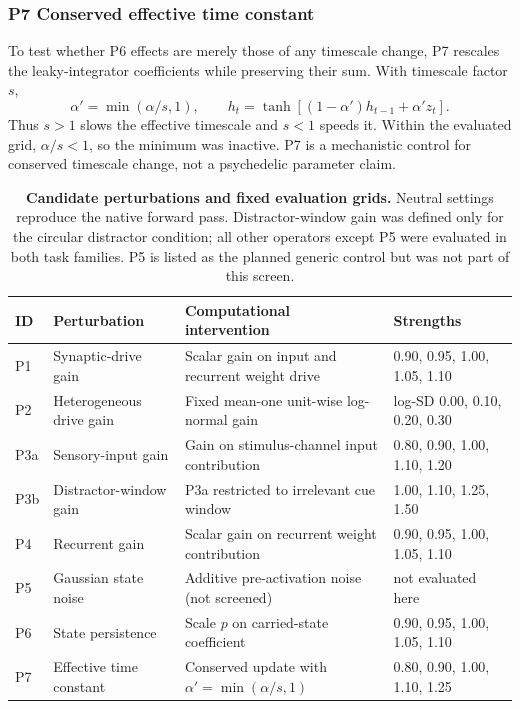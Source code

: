 \documentclass[11pt,reprint,aps,prl,floatfix,secnumarabic]{revtex4-2}
\begin{document}
\subsubsection{P7 Conserved effective time constant}
To test whether P6 effects are merely those of any timescale change, P7
rescales the leaky-integrator coefficients while preserving their sum. With
timescale factor $s$,
\begin{equation}
 \alpha'=\min(\alpha/s,1),\qquad
 h_t=\tanh\!\left[(1-\alpha')h_{t-1}+\alpha'z_t\right].
 \label{eq:p7}
\end{equation}
Thus $s>1$ slows the effective timescale and $s<1$ speeds it. Within the
evaluated grid, $\alpha/s<1$, so the minimum was inactive. P7 is a
mechanistic control for conserved timescale change, not a psychedelic
parameter claim.

\begin{table}[t]
\caption{\textbf{Candidate perturbations and fixed evaluation grids.}
Neutral settings reproduce the native forward pass. Distractor-window gain was
defined only for the circular distractor condition; all other operators except
P5 were evaluated in both task families. P5 is listed as the planned generic
control but was not part of this screen.}
\label{tab:perturbations}
\centering
\begin{tabular}{llll}
\toprule
ID & Perturbation & Computational intervention & Strengths \\
\midrule
P1 & Synaptic-drive gain & Scalar gain on input and recurrent weight drive
& 0.90, 0.95, 1.00, 1.05, 1.10 \\
P2 & Heterogeneous drive gain & Fixed mean-one unit-wise log-normal gain
& log-SD 0.00, 0.10, 0.20, 0.30 \\
P3a & Sensory-input gain & Gain on stimulus-channel input contribution
& 0.80, 0.90, 1.00, 1.10, 1.20 \\
P3b & Distractor-window gain & P3a restricted to irrelevant cue window
& 1.00, 1.10, 1.25, 1.50 \\
P4 & Recurrent gain & Scalar gain on recurrent weight contribution
& 0.90, 0.95, 1.00, 1.05, 1.10 \\
P5 & Gaussian state noise & Additive pre-activation noise (not screened)
& not evaluated here \\
P6 & State persistence & Scale $p$ on carried-state coefficient
& 0.90, 0.95, 1.00, 1.05, 1.10 \\
P7 & Effective time constant & Conserved update with $\alpha'=\min(\alpha/s,1)$
& 0.80, 0.90, 1.00, 1.10, 1.25 \\
\bottomrule
\end{tabular}
\end{table}
\end{document}
